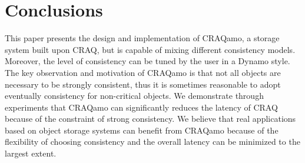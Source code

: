 \section{Conclusions}
This paper presents the design and implementation of CRAQamo, a storage system built upon CRAQ, but is capable of mixing different consistency models. Moreover, the level of consistency can be tuned by the user in a Dynamo style. The key observation and motivation of CRAQamo is that not all objects are necessary to be strongly consistent, thus it is sometimes reasonable to adopt eventually consistency for non-critical objects. We demonstrate through experiments that CRAQamo can significantly reduces the latency of CRAQ because of the constraint of strong consistency. We believe that real applications based on object storage systems can benefit from CRAQamo because of the flexibility of choosing consistency and the overall latency can be minimized to the largest extent.
\label{sec:conclusion}


